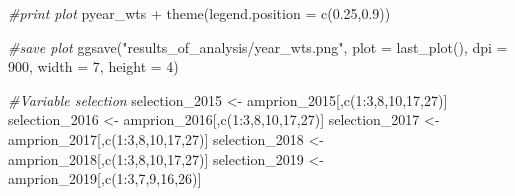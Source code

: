 \documentclass[a4paper,11pt]{article}
\newenvironment{Shaded}{\begin{snugshade}}{\end{snugshade}}
\newcommand{\AttributeTok}[1]{\textcolor[rgb]{0.77,0.63,0.00}{#1}}
\newcommand{\CommentTok}[1]{\textcolor[rgb]{0.56,0.35,0.01}{\textit{#1}}}
\newcommand{\DecValTok}[1]{\textcolor[rgb]{0.00,0.00,0.81}{#1}}
\newcommand{\FloatTok}[1]{\textcolor[rgb]{0.00,0.00,0.81}{#1}}
\newcommand{\FunctionTok}[1]{\textcolor[rgb]{0.00,0.00,0.00}{#1}}
\newcommand{\NormalTok}[1]{#1}
\newcommand{\OtherTok}[1]{\textcolor[rgb]{0.56,0.35,0.01}{#1}}
\newcommand{\SpecialCharTok}[1]{\textcolor[rgb]{0.00,0.00,0.00}{#1}}
\newcommand{\StringTok}[1]{\textcolor[rgb]{0.31,0.60,0.02}{#1}}
\begin{document}
\begin{Shaded}
\begin{Highlighting}[]
\CommentTok{\#print plot}
\NormalTok{pyear\_wts }\SpecialCharTok{+} \FunctionTok{theme}\NormalTok{(}\AttributeTok{legend.position =} \FunctionTok{c}\NormalTok{(}\FloatTok{0.25}\NormalTok{,}\FloatTok{0.9}\NormalTok{))}


\CommentTok{\#save plot}
\FunctionTok{ggsave}\NormalTok{(}\StringTok{"results\_of\_analysis/year\_wts.png"}\NormalTok{,}
       \AttributeTok{plot =} \FunctionTok{last\_plot}\NormalTok{(),}
       \AttributeTok{dpi =} \DecValTok{900}\NormalTok{,}
       \AttributeTok{width =} \DecValTok{7}\NormalTok{,}
       \AttributeTok{height =} \DecValTok{4}\NormalTok{)}

\CommentTok{\#Variable selection}
\NormalTok{selection\_2015 }\OtherTok{\textless{}{-}}\NormalTok{ amprion\_2015[,}\FunctionTok{c}\NormalTok{(}\DecValTok{1}\SpecialCharTok{:}\DecValTok{3}\NormalTok{,}\DecValTok{8}\NormalTok{,}\DecValTok{10}\NormalTok{,}\DecValTok{17}\NormalTok{,}\DecValTok{27}\NormalTok{)]}
\NormalTok{selection\_2016 }\OtherTok{\textless{}{-}}\NormalTok{ amprion\_2016[,}\FunctionTok{c}\NormalTok{(}\DecValTok{1}\SpecialCharTok{:}\DecValTok{3}\NormalTok{,}\DecValTok{8}\NormalTok{,}\DecValTok{10}\NormalTok{,}\DecValTok{17}\NormalTok{,}\DecValTok{27}\NormalTok{)]}
\NormalTok{selection\_2017 }\OtherTok{\textless{}{-}}\NormalTok{ amprion\_2017[,}\FunctionTok{c}\NormalTok{(}\DecValTok{1}\SpecialCharTok{:}\DecValTok{3}\NormalTok{,}\DecValTok{8}\NormalTok{,}\DecValTok{10}\NormalTok{,}\DecValTok{17}\NormalTok{,}\DecValTok{27}\NormalTok{)]}
\NormalTok{selection\_2018 }\OtherTok{\textless{}{-}}\NormalTok{ amprion\_2018[,}\FunctionTok{c}\NormalTok{(}\DecValTok{1}\SpecialCharTok{:}\DecValTok{3}\NormalTok{,}\DecValTok{8}\NormalTok{,}\DecValTok{10}\NormalTok{,}\DecValTok{17}\NormalTok{,}\DecValTok{27}\NormalTok{)]}
\NormalTok{selection\_2019 }\OtherTok{\textless{}{-}}\NormalTok{ amprion\_2019[,}\FunctionTok{c}\NormalTok{(}\DecValTok{1}\SpecialCharTok{:}\DecValTok{3}\NormalTok{,}\DecValTok{7}\NormalTok{,}\DecValTok{9}\NormalTok{,}\DecValTok{16}\NormalTok{,}\DecValTok{26}\NormalTok{)]}


\end{Highlighting}
\end{Shaded}
\end{document}
